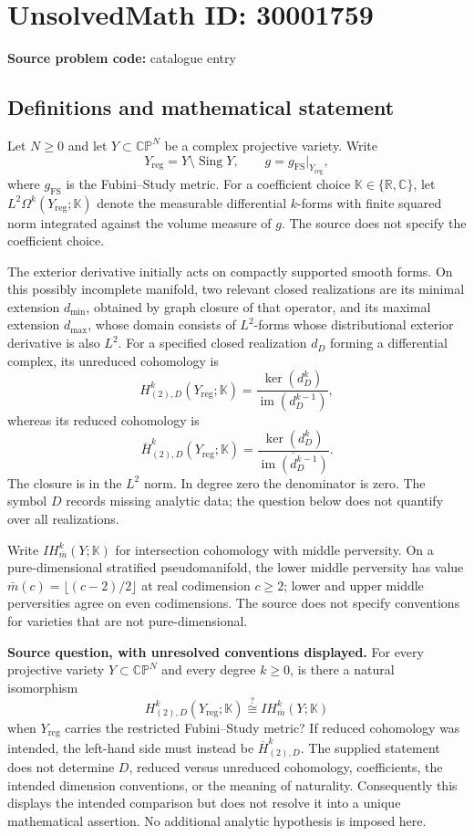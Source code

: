 \documentclass[11pt]{article}
\newcommand{\R}{\mathbb{R}}
\newcommand{\C}{\mathbb{C}}
\begin{document}
\section*{UnsolvedMath ID: 30001759}
\textbf{Source problem code:} catalogue entry
\subsection{Definitions and mathematical statement}
Let \(N\geq 0\) and let \(Y\subset\mathbb{CP}^{N}\) be a complex projective variety. Write
\[
Y_{\mathrm{reg}}=Y\setminus\operatorname{Sing}Y,
\qquad g=g_{\mathrm{FS}}|_{Y_{\mathrm{reg}}},
\]
where \(g_{\mathrm{FS}}\) is the Fubini--Study metric. For a coefficient choice \(\mathbb K\in\{\R,\C\}\), let \(L^{2}\Omega^{k}(Y_{\mathrm{reg}};\mathbb K)\) denote the measurable differential \(k\)-forms with finite squared norm integrated against the volume measure of \(g\). The source does not specify the coefficient choice.

The exterior derivative initially acts on compactly supported smooth forms. On this possibly incomplete manifold, two relevant closed realizations are its minimal extension \(d_{\min}\), obtained by graph closure of that operator, and its maximal extension \(d_{\max}\), whose domain consists of \(L^{2}\)-forms whose distributional exterior derivative is also \(L^{2}\). For a specified closed realization \(d_D\) forming a differential complex, its unreduced cohomology is
\[
H^{k}_{(2),D}(Y_{\mathrm{reg}};\mathbb K)
=
\frac{\ker(d_D^{k})}{\operatorname{im}(d_D^{k-1})},
\]
whereas its reduced cohomology is
\[
\overline H^{k}_{(2),D}(Y_{\mathrm{reg}};\mathbb K)
=
\frac{\ker(d_D^{k})}{\overline{\operatorname{im}(d_D^{k-1})}}.
\]
The closure is in the \(L^{2}\) norm. In degree zero the denominator is zero. The symbol \(D\) records missing analytic data; the question below does not quantify over all realizations.

Write \(IH^{k}_{\bar m}(Y;\mathbb K)\) for intersection cohomology with middle perversity. On a pure-dimensional stratified pseudomanifold, the lower middle perversity has value \(\bar m(c)=\lfloor(c-2)/2\rfloor\) at real codimension \(c\geq2\); lower and upper middle perversities agree on even codimensions. The source does not specify conventions for varieties that are not pure-dimensional.

\textbf{Source question, with unresolved conventions displayed.} For every projective variety \(Y\subset\mathbb{CP}^{N}\) and every degree \(k\geq0\), is there a natural isomorphism
\[
H^{k}_{(2),D}(Y_{\mathrm{reg}};\mathbb K)
\stackrel{?}{\cong}
IH^{k}_{\bar m}(Y;\mathbb K)
\]
when \(Y_{\mathrm{reg}}\) carries the restricted Fubini--Study metric? If reduced cohomology was intended, the left-hand side must instead be \(\overline H^{k}_{(2),D}\). The supplied statement does not determine \(D\), reduced versus unreduced cohomology, coefficients, the intended dimension conventions, or the meaning of naturality. Consequently this displays the intended comparison but does not resolve it into a unique mathematical assertion. No additional analytic hypothesis is imposed here.
\end{document}
